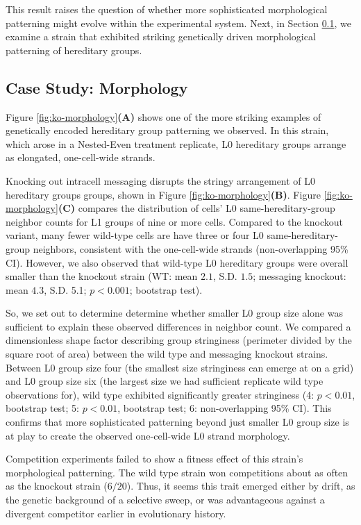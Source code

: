 This result raises the question of whether more sophisticated morphological patterning might evolve within the experimental system.
Next, in Section \ref{sec:morphology}, we examine a strain that exhibited striking genetically driven morphological patterning of hereditary groups.

\subsection{Case Study: Morphology} \label{sec:morphology}



Figure \ref{fig:ko-morphology}\textbf{(A)} shows one of the more striking examples of genetically encoded hereditary group patterning we observed.
In this strain, which arose in a Nested-Even treatment replicate, L0 hereditary groups arrange as elongated, one-cell-wide strands.

Knocking out intracell messaging disrupts the stringy arrangement of L0 hereditary groups groups, shown in Figure \ref{fig:ko-morphology}\textbf{(B)}.
Figure \ref{fig:ko-morphology}\textbf{(C)} compares the distribution of cells' L0 same-hereditary-group neighbor counts for L1 groups of nine or more cells.
Compared to the knockout variant, many fewer wild-type cells are have three or four L0 same-hereditary-group neighbors, consistent with the one-cell-wide strands (non-overlapping 95\% CI).
However, we also observed that wild-type L0 hereditary groups were overall smaller than the knockout strain
(WT: mean $2.1$, S.D. $1.5$; messaging knockout: mean $4.3$, S.D. 5.1; $p < 0.001$; bootstrap test).

So, we set out to determine determine whether smaller L0 group size alone was sufficient to explain these observed differences in neighbor count.
We compared a dimensionless shape factor describing group stringiness (perimeter divided by the square root of area) between the wild type and messaging knockout strains.
Between L0 group size four (the smallest size stringiness can emerge at on a grid) and L0 group size six (the largest size we had sufficient replicate wild type observations for), wild type exhibited significantly greater stringiness
(4: $p < 0.01$, bootstrap test; 5: $p < 0.01$, bootstrap test; 6: non-overlapping 95\% CI).
This confirms that more sophisticated patterning beyond just smaller L0 group size is at play to create the observed one-cell-wide L0 strand morphology.

Competition experiments failed to show a fitness effect of this strain's morphological patterning.
The wild type strain won competitions about as often as the knockout strain ($6/20$).
Thus, it seems this trait emerged either by drift, as the genetic background of a selective sweep, or was advantageous against a divergent competitor earlier in evolutionary history.


